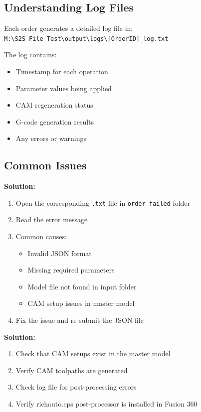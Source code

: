 \documentclass[11pt,letterpaper]{article}
\begin{document}
\subsection{Understanding Log Files}

Each order generates a detailed log file in:\\
\texttt{M:\textbackslash S2S File Test\textbackslash output\textbackslash logs\textbackslash [OrderID]\_log.txt}

The log contains:
\begin{itemize}
    \item Timestamp for each operation
    \item Parameter values being applied
    \item CAM regeneration status
    \item G-code generation results
    \item Any errors or warnings
\end{itemize}

\subsection{Common Issues}

\begin{tcolorbox}[colback=red!5!white,colframe=red!75!black,title=Problem: Order moved to failed folder]
\textbf{Solution:}
\begin{enumerate}[noitemsep]
    \item Open the corresponding \texttt{.txt} file in \texttt{order\_failed} folder
    \item Read the error message
    \item Common causes:
    \begin{itemize}
        \item Invalid JSON format
        \item Missing required parameters
        \item Model file not found in input folder
        \item CAM setup issues in master model
    \end{itemize}
    \item Fix the issue and re-submit the JSON file
\end{enumerate}
\end{tcolorbox}

\begin{tcolorbox}[colback=red!5!white,colframe=red!75!black,title=Problem: No G-code files generated]
\textbf{Solution:}
\begin{enumerate}[noitemsep]
    \item Check that CAM setups exist in the master model
    \item Verify CAM toolpaths are generated
    \item Check log file for post-processing errors
    \item Verify richauto.cps post-processor is installed in Fusion 360
\end{enumerate}
\end{tcolorbox}
\end{document}
